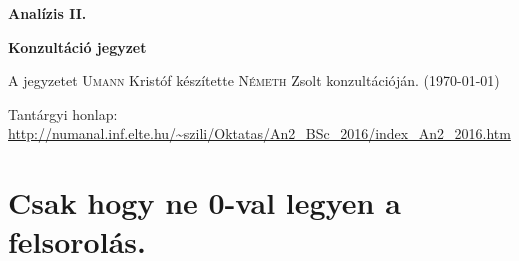 \documentclass[a4paper,11.5pt]{article}
\begin{document}
	\setlength\parindent{0pt}
	\def\s{\hspace{0.2mm}\vphantom{\beta}}
	\def\Z{\mathbb{Z}}
	\def\Q{\mathbb{Q}}
	\def\R{\mathbb{R}}
	\def\C{\mathbb{C}}
	\def\N{\mathbb{N}}
	\def\Rn{\mathbb{R}^{n}}
	\def\Ra{\overline{\mathbb{R}}}
	\def\sume{\displaystyle\sum_{n=1}^{+\infty}}
	\def\sumn{\displaystyle\sum_{n=0}^{+\infty}}
	\def\biz{\emph{Bizonyítás:\ }}
	\def\narrow{\underset{n\rightarrow+\infty}{\longrightarrow}}
	\def\limn{\displaystyle\lim_{n\to +\infty}}
	\def\limx{\displaystyle\lim_{x\to +\infty}}
	
	\theoremstyle{definition}
	\newtheorem{theorem}{Tétel}[subsection] %
	
	\theoremstyle{definition}
	\newtheorem{definition}[theorem]{Definíció} %
	\newtheorem{example}[theorem]{Példa} %
	\newtheorem{task}[theorem]{Feladat} %
	\newtheorem{note}[theorem]{Megjegyzés} %
	\newtheorem{revision}[theorem]{Emlékeztető} %
	\begin{center}
		{\LARGE \textbf{Analízis II.}}
		
		{\large \textbf{Konzultáció jegyzet}}
		
	\end{center}
	A jegyzetet \textsc{Umann} Kristóf készítette \textsc{Németh} Zsolt konzultációján. (\today)
	
	Tantárgyi honlap: \url{http://numanal.inf.elte.hu/~szili/Oktatas/An2_BSc_2016/index_An2_2016.htm}
	
	\section{Csak hogy ne 0-val legyen a felsorolás.}
\end{document}
